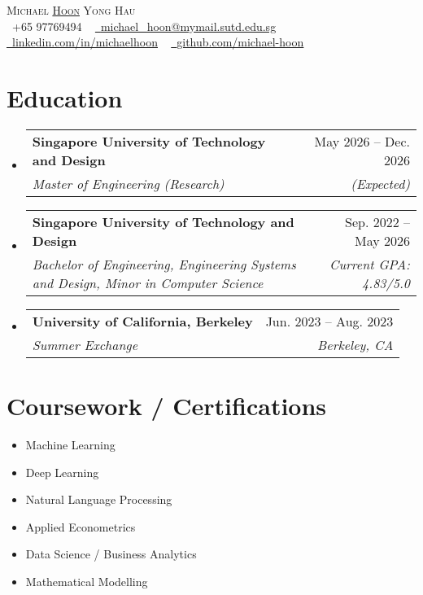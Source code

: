 \documentclass[letterpaper,11pt]{article}
\makeatletter
\newcommand{\resumeSubheading}[4]{
  \vspace{-2pt}\item
    \begin{tabular*}{1.0\textwidth}[t]{l@{\extracolsep{\fill}}r}
      \textbf{#1} & \small #2 \\
      \textit{\small#3} & \textit{\small #4} \\
    \end{tabular*}\vspace{-7pt}
}
\newcommand{\resumeSubHeadingListStart}{\begin{itemize}[leftmargin=0.0in, label={}]}
\newcommand{\resumeSubHeadingListEnd}{\end{itemize}}
\makeatother
\begin{document}
\begin{center}
    {\Huge \scshape Michael \underline{Hoon} Yong Hau} \\ \vspace{8pt}
    \small \raisebox{-0.1\height}\faPhone\ +65 97769494 ~ \href{mailto:michael_hoon@mymail.sutd.edu.sg}{\raisebox{-0.2\height}\faEnvelope\  \underline{michael\_hoon@mymail.sutd.edu.sg}} ~ 
    \href{https://linkedin.com/in/michaelhoon}{\raisebox{-0.2\height}\faLinkedin\ \underline{linkedin.com/in/michaelhoon}}  ~
    \href{https://github.com/michael-hoon}{\raisebox{-0.2\height}\faGithub\ \underline{github.com/michael-hoon}}
\end{center}


\section{Education}
  \resumeSubHeadingListStart
    \resumeSubheading
      {Singapore University of Technology and Design}{May 2026 -- Dec. 2026}
      {Master of Engineering (Research)}{(Expected)}
    \resumeSubheading
      {Singapore University of Technology and Design}{Sep. 2022 -- May 2026}
      {Bachelor of Engineering, Engineering Systems and Design, Minor in Computer Science}{Current GPA: 4.83/5.0}
    \resumeSubheading
    {University of California, Berkeley}{Jun. 2023 -- Aug. 2023}
    {Summer Exchange}{Berkeley, CA}
  \resumeSubHeadingListEnd

\section{Coursework / Certifications}
        \begin{multicols}{3}
            \begin{itemize}[itemsep=-5pt, parsep=3pt]
                \item\small Machine Learning  
                \item Deep Learning
                \item Natural Language Processing
                \item Applied Econometrics
                \item Data Science / Business Analytics 
                \item Mathematical Modelling
            \end{itemize}
        \end{multicols}
\end{document}
